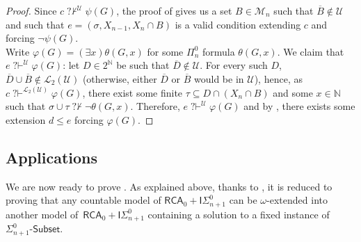 \documentclass{article}
\def\NN{\mathbb{N}}
\def\U{\mathcal{U}}
\def\M{\mathcal{M}}
\renewcommand{\L}[0]{\mathcal{L}}
\newcommand{\ISig}{\mathsf{I}\Sigma^0}
\newcommand{\qvdash}{\operatorname{{?}{\vdash}}}
\newcommand{\nqvdash}{\operatorname{{?}{\nvdash}}}
\newcommand{\Sub}[1]{{#1}\mbox{-}\mathsf{Subset}}
\newcommand{\RCA}{\mathsf{RCA}}
\numberwithin{theorem}{section}
\theoremstyle{definition}
\begin{document}
\begin{proof}
Since $c \nqvdash^{\U} \psi(G)$, the proof of  gives us a set $B \in \M_n$ such that $\overline{B} \notin \U$ and such that $e = (\sigma,X_{n-1},X_n \cap B)$ is a valid condition extending $c$ and forcing $\neg \psi(G)$. \\

Write $\varphi(G) = (\exists x)\theta(G,x)$ for some $\Pi_n^0$ formula $\theta(G,x)$. We claim that $e \qvdash^{\U} \varphi(G)$: let $D \in 2^{\NN}$ be such that $\overline{D} \notin \U$. For every such $D$, $\overline{D} \cup \overline{B} \notin \L_2(\U)$ (otherwise, either $\overline{D}$ or $\overline{B}$ would be in $\U$), hence, as $c \qvdash^{\L_2(\U)} \varphi(G)$, there exist some finite $\tau \subseteq D \cap (X_n \cap B)$ and some $x \in \NN$ such that $\sigma \cup \tau \nqvdash \neg \theta(G,x)$. Therefore, $e \qvdash^{\U} \varphi(G)$ and by , there exists some extension $d \leq e$ forcing $\varphi(G)$.
\end{proof}

\subsection{Applications}

We are now ready to prove . As explained above, thanks to , it is reduced to proving that any countable model of $\RCA_0 + \ISig_{n+1}$ can be $\omega$-extended into another model of~$\RCA_0 + \ISig_{n+1}$ containing a solution to a fixed instance of $\Sub{\Sigma^0_{n+1}}$.
\end{document}
